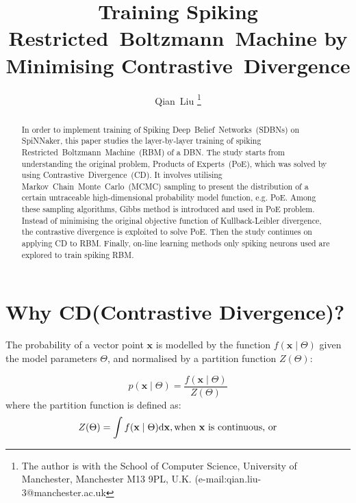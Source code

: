 \documentclass[11pt,twoside,a4paper]{article}
\def\D{\mathrm{d}}
\begin{document}
	\title{Training Spiking Restricted~Boltzmann~Machine by Minimising Contrastive~Divergence}
	\author{
	Qian~Liu
	\thanks{
	The author is with the School of Computer Science, University of Manchester, Manchester M13 9PL, U.K. 
	(e-mail:qian.liu-3@manchester.ac.uk}
	}
	\maketitle
	\thispagestyle{empty}

\begin{abstract}
	In order to implement training of Spiking Deep~Belief~Networks~(SDBNs) on SpiNNaker, this paper studies the layer-by-layer training of spiking Restricted~Boltzmann~Machine~(RBM) of a DBN.
	The study starts from understanding the original problem, Products of Experts~(PoE), which was solved by using Contrastive~Divergence~(CD).
	It involves utilising Markov~Chain~Monte~Carlo~(MCMC) sampling to present the distribution of a certain untraceable high-dimensional probability model function, e.g. PoE.
	Among these sampling algorithms, Gibbs method is introduced and used in PoE problem.
	Instead of minimising the original objective function of Kullback-Leibler divergence, the contrastive divergence is exploited to solve PoE.
	Then the study continues on applying CD to RBM.
	Finally, on-line learning methods only spiking neurons used are explored to train spiking RBM.
\end{abstract}

\section{Why CD(Contrastive Divergence)?\cite{hinton2002training,woodfordnotes}}
	The probability of a vector point $ \mathbf{x} $ is modelled by the function $f(\mathbf{x} \mid \Theta )$ given the model parameters $ \Theta $, and normalised by a partition function $Z( \Theta)$:
	
	\begin{equation}
	p(\mathbf{x} \mid \Theta ) = \dfrac{f(\mathbf{x} \mid \Theta )}{Z( \Theta)}
	\end{equation}
	where the partition function is defined as:
	\begin{equation}
	\label{equ:z_int}
	Z( \Theta) = \int f(\mathbf{x} \mid \Theta )\D\mathbf{x}, \text{when  $ \mathbf{x} $ is continuous, or}
	\end{equation}
	
\end{document}
